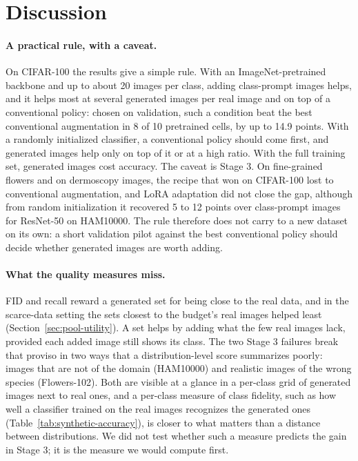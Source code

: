 \section{Discussion}
\label{sec:discussion}

\paragraph{A practical rule, with a caveat.}
On CIFAR-100 the results give a simple rule. With an ImageNet-pretrained backbone and up to about 20 images per
class, adding class-prompt images helps, and it helps most at several generated images per real image and on top
of a conventional policy: chosen on validation, such a condition beat the best conventional augmentation in 8 of
10 pretrained cells, by up to 14.9 points. With a randomly initialized classifier, a conventional policy should
come first, and generated images help only on top of it or at a high ratio. With the full training set, generated
images cost accuracy. The caveat is Stage 3. On fine-grained flowers and on dermoscopy images, the recipe that won
on CIFAR-100 lost to conventional augmentation, and LoRA adaptation did not close the gap, although from random initialization it
recovered 5 to 12 points over class-prompt images for ResNet-50 on HAM10000. The rule therefore does not
carry to a new dataset on its own: a short validation pilot against the best conventional policy should decide
whether generated images are worth adding.

\paragraph{What the quality measures miss.}
FID and recall reward a generated set for being close to the real data, and in the scarce-data setting the sets
closest to the budget's real images helped least (Section~\ref{sec:pool-utility}). A set helps by adding what the
few real images lack, provided each added image still shows its class. The two Stage 3 failures break that
proviso in two ways that a distribution-level score summarizes poorly: images that are not of the domain
(HAM10000) and realistic images of the wrong species (Flowers-102). Both are visible at a glance in a per-class
grid of generated images next to real ones, and a per-class measure of class fidelity, such as how well a
classifier trained on the real images recognizes the generated ones (Table~\ref{tab:synthetic-accuracy}), is
closer to what matters than a distance between distributions. We did not test whether such a measure predicts
the gain in Stage 3; it is the measure we would compute first.

